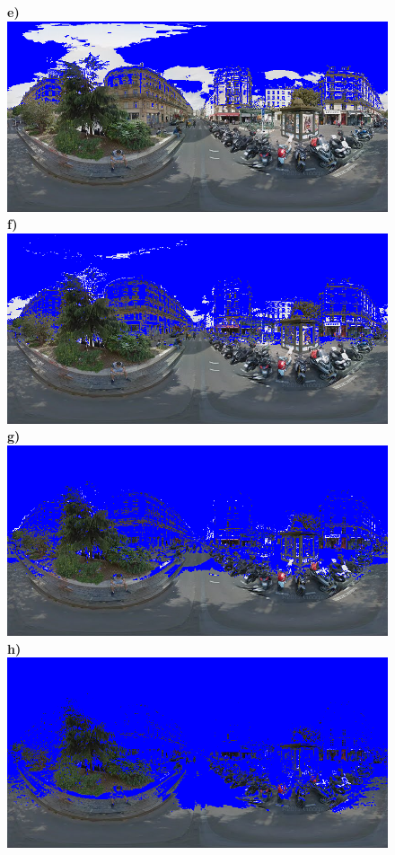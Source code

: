 \documentclass{article}
\begin{document}
\begin{figure}
\textbf{\scriptsize{e)}}\includegraphics[scale=0.13]{Images/2/panorama-JtVHmEl7WCiz1xJ0bcJpBg-1_Sobel_80_marked.png}\hfill%
\textbf{\scriptsize{f)}}\includegraphics[scale=0.13]{Images/2/panorama-JtVHmEl7WCiz1xJ0bcJpBg-1_Sobel_70_marked.png}\hfill%
\textbf{\scriptsize{g)}}\includegraphics[scale=0.13]{Images/2/panorama-JtVHmEl7WCiz1xJ0bcJpBg-1_Sobel_60_marked.png}\hfill%
\textbf{\scriptsize{h)}}\includegraphics[scale=0.13]{Images/2/panorama-JtVHmEl7WCiz1xJ0bcJpBg-1_Sobel_50_marked.png} 

\end{figure}
\end{document}
